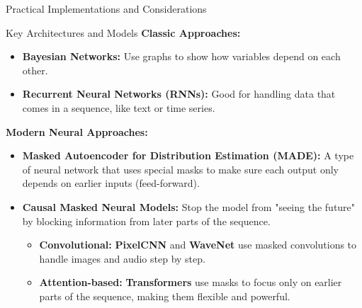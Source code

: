 \begin{frame}[allowframebreaks]{}
    \centering
    \LARGE Practical Implementations and Considerations
\end{frame}

\begin{frame}[allowframebreaks]{Key Architectures and Models}
    \textbf{\large Classic Approaches:}
    \begin{itemize}
        \item \textbf{Bayesian Networks:} Use graphs to show how variables depend on each other.
        \item \textbf{Recurrent Neural Networks (RNNs):} Good for handling data that comes in a sequence, like text or time series.
    \end{itemize}

    \framebreak

    \textbf{\large Modern Neural Approaches:}
    \begin{itemize}
        \item \textbf{Masked Autoencoder for Distribution Estimation (MADE):} A type of neural network that uses special masks to make sure each output only depends on earlier inputs (feed-forward).
        \item \textbf{Causal Masked Neural Models:} Stop the model from "seeing the future" by blocking information from later parts of the sequence.
        \begin{itemize}
            \item \textbf{Convolutional:} \textbf{PixelCNN} and \textbf{WaveNet} use masked convolutions to handle images and audio step by step.
            \item \textbf{Attention-based:} \textbf{Transformers} use masks to focus only on earlier parts of the sequence, making them flexible and powerful.
        \end{itemize}
    \end{itemize}
\end{frame}

